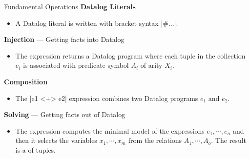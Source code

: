 \begin{frame}[fragile]{Fundamental Operations}
\textbf{Datalog Literals}
\begin{itemize}
    \small
    \item A Datalog literal is written with bracket syntax \Code|#{...}|.
\end{itemize}

\pause

\textbf{Injection} --- Getting facts into Datalog
\begin{itemize}
    \small
    \item The  expression returns a
    Datalog program where each tuple in the collection $e_i$ is associated with
    predicate symbol $A_i$ of arity $X_i$.
\end{itemize}

\pause

\textbf{Composition}
\begin{itemize}
    \small
    \item The \Code|e1 <+> e2| expression combines two Datalog programs $e_1$
    and $e_2$.
\end{itemize}

\pause

\textbf{Solving} --- Getting facts out of Datalog
\begin{itemize}
    \small
    \item The 
    expression computes the minimal model of the expressions $e_1, \cdots, e_n$
    and then it selects the variables $x_1, \cdots, x_m$ from the relations
    $A_1, \cdots, A_o$. The result is a  of tuples.
\end{itemize}
\end{frame}


